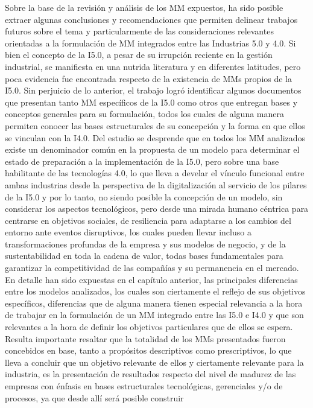 \documentclass{article}
\begin{document}
Sobre la base de la revisión y análisis de los MM expuestos, ha sido
posible extraer algunas conclusiones y recomendaciones que permiten
delinear trabajos futuros sobre el tema y particularmente de las
consideraciones relevantes orientadas a la formulación de MM integrados
entre las Industrias 5.0 y 4.0. Si bien el concepto de la I5.0, a pesar
de su irrupción reciente en la gestión industrial, se manifiesta en una
nutrida literatura y en diferentes latitudes, pero poca evidencia fue
encontrada respecto de la existencia de MMs propios de la I5.0. Sin
perjuicio de lo anterior, el trabajo logró identificar algunos
documentos que presentan tanto MM específicos de la I5.0 como otros que
entregan bases y conceptos generales para su formulación, todos los
cuales de alguna manera permiten conocer las bases estructurales de su
concepción y la forma en que ellos se vinculan con la I4.0. Del estudio
se desprende que en todos los MM analizados existe un denominador común
en la propuesta de un modelo para determinar el estado de preparación a
la implementación de la I5.0, pero sobre una base habilitante de las
tecnologías 4.0, lo que lleva a develar el vínculo funcional entre ambas
industrias desde la perspectiva de la digitalización al servicio de los
pilares de la I5.0 y por lo tanto, no siendo posible la concepción de un
modelo, sin considerar los aspectos tecnológicos, pero desde una mirada
humano céntrica para centrarse en objetivos sociales, de resiliencia
para adaptarse a los cambios del entorno ante eventos disruptivos, los
cuales pueden llevar incluso a transformaciones profundas de la empresa
y sus modelos de negocio, y de la sustentabilidad en toda la cadena de
valor, todas bases fundamentales para garantizar la competitividad de
las compañías y su permanencia en el mercado. En detalle han sido
expuestas en el capítulo anterior, las principales diferencias entre los
modelos analizados, los cuales son ciertamente el reflejo de sus
objetivos específicos, diferencias que de alguna manera tienen especial
relevancia a la hora de trabajar en la formulación de un MM integrado
entre las I5.0 e I4.0 y que son relevantes a la hora de definir los
objetivos particulares que de ellos se espera. Resulta importante
resaltar que la totalidad de los MMs presentados fueron concebidos en
base, tanto a propósitos descriptivos como prescriptivos, lo que lleva a
concluir que un objetivo relevante de ellos y ciertamente relevante para
la industria, es la presentación de resultados respecto del nivel de
madurez de las empresas con énfasis en bases estructurales tecnológicas,
gerenciales y/o de procesos, ya que desde allí será posible construir
\end{document}
